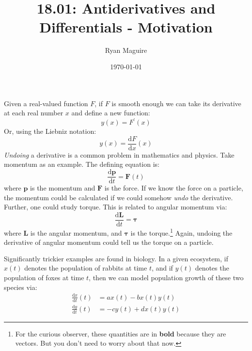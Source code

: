 \documentclass{article}
\title{18.01: Antiderivatives and Differentials - Motivation}
\author{Ryan Maguire}
\date{\today}
\begin{document}
    \maketitle
\fi
    Given a real-valued function $F$, if $F$ is smooth enough we can take its
    derivative at each real number $x$ and define a new function:
    \begin{equation}
        y(x)=F^{\prime}(x)
    \end{equation}
    Or, using the Liebniz notation:
    \begin{equation}
        y(x)=\frac{\textrm{d}F}{\textrm{d}x}(x)
    \end{equation}
    \textit{Undoing} a derivative is a common problem in
    mathematics and physics. Take momentum as an example.
    The defining equation is:
    \begin{equation}
        \frac{\textrm{d}\mathbf{p}}{\textrm{d}t}=\mathbf{F}(t)
    \end{equation}
    where $\mathbf{p}$ is the momentum and $\mathbf{F}$ is the force.
    If we know the force on a particle, the momentum could be
    calculated if we could somehow \textit{undo} the derivative.
    Further, one could study torque. This is related to angular momentum
    via:
    \begin{equation}
        \frac{\textrm{d}\mathbf{L}}{\textrm{d}t}=\boldsymbol{\tau}
    \end{equation}
    where $\mathbf{L}$ is the angular momentum, and $\boldsymbol{\tau}$ is the
    torque.\footnote{%
        For the curious observer, these quantities are in \textbf{bold} because
        they are vectors. But you don't need to worry about that now.
    }
    Again, undoing the derivative of angular momentum could tell us the
    torque on a particle.
    \par\hfill\par
    Significantly trickier examples are found in biology. In a given
    ecosystem, if $x(t)$ denotes the population of rabbits at time $t$, and if
    $y(t)$ denotes the population of foxes at time $t$, then we can model
    population growth of these two species via:
    \begin{equation}
        \begin{aligned}
            \frac{\textrm{d}x}{\textrm{d}t}(t)
                &=ax(t)-bx(t)y(t)\\
            \frac{\textrm{d}y}{\textrm{d}t}(t)
                &=-cy(t)+dx(t)y(t)
        \end{aligned}
    \end{equation}
\end{document}
